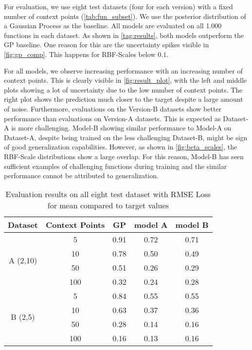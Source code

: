 For evaluation, we use eight test datasets (four for each version) with a fixed number of context points (\autoref{tab:fun_subset}). We use the posterior distribution of a Gaussian Process as the baseline. All models are evaluated on all 1.000 functions in each dataset.
As shown in \autoref{tag:results}, both models outperform the GP baseline. One reason for this are the uncertainty spikes visible in \autoref{fig:gp_comp}. This happens for RBF-Scales below $0.1$.

For all models, we observe increasing performance with an increasing number of context points. This is clearly visible in \autoref{fig:result_plot}, with the left and middle plots showing a lot of uncertainty due to the low number of context points. The right plot shows the prediction much closer to the target despite a large amount of noise. Furthermore, evaluations on the Version-B datasets show better performance than evaluations on Version-A datasets. This is expected as Dataset-A is more challenging. Model-B showing similar performance to Model-A on Dataset-A, despite being trained on the less challenging Dataset-B, might be sign of good generalization capabilities. However, as shown in \autoref{fig:beta_scales}, the RBF-Scale distributions show a large overlap. For this reason, Model-B has seen sufficient examples of challenging functions during training and the similar performance cannot be attributed to generalization.

\begin{table}[]
	\caption{Evaluation results on all eight test dataset with RMSE Loss for mean compared to target values}
	\begin{tabular}{c c c c c}
		\toprule
		Dataset & Context Points & GP & model A & model B\\
		\midrule
		\multirow{4}{*}{A (2,10)} & 5 & 0.91 & 0.72 & 0.71\\
		&10& 0.78 & 0.50 & 0.49\\ 
		&50 & 0.51 & 0.26 & 0.29\\
		&100 & 0.32 & 0.24 & 0.28\\\midrule
		\multirow{4}{*}{B (2,5)} & 5 & 0.84 & 0.55 & 0.55\\
		& 10 & 0.63 & 0.37 & 0.36\\
		& 50 & 0.28 & 0.14 & 0.16\\
		& 100 & 0.16 & 0.13 & 0.16\\\bottomrule
	\end{tabular}
	\label{tag:results}
\end{table}

